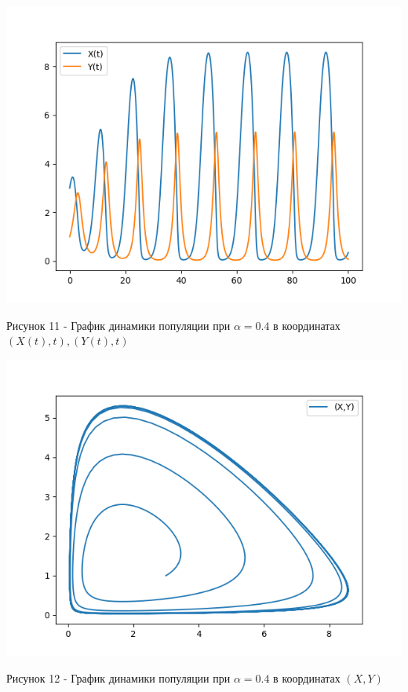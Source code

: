 \documentclass[a4paper,14pt]{extreport}
\begin{document}
\begin{center}
    \begin{minipage}[htb]{0.8\linewidth}
    \includegraphics[width=14cm]{n8.png}
    \end{minipage}
    \end{center}
    \begin{center}
        Рисунок 11 - График динамики популяции при $\alpha = 0.4$ в координатах $(X(t),t),(Y(t),t)$
    \end{center}
    \begin{center}
    \begin{minipage}[htb]{0.8\linewidth}
    \includegraphics[width=14cm]{8.png}
    \end{minipage}
    \end{center}
    \begin{center}
        Рисунок 12 - График динамики популяции при $\alpha = 0.4$ в координатах $(X,Y)$  
    \end{center}
\end{document}
